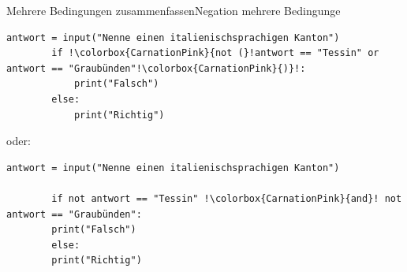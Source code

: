 \begin{frame}[fragile]{Mehrere Bedingungen zusammenfassen}{Negation mehrere Bedingunge}
    \begin{lstlisting}[escapechar=!, basicstyle=\ttfamily\footnotesize]
        antwort = input("Nenne einen italienischsprachigen Kanton")
        if !\colorbox{CarnationPink}{not (}!antwort == "Tessin" or antwort == "Graubünden"!\colorbox{CarnationPink}{)}!:
            print("Falsch")
        else:
            print("Richtig")
    \end{lstlisting}
    
    oder:
    
    \begin{lstlisting}[escapechar=!, basicstyle=\ttfamily\footnotesize]
        antwort = input("Nenne einen italienischsprachigen Kanton")
        
        if not antwort == "Tessin" !\colorbox{CarnationPink}{and}! not antwort == "Graubünden":
        print("Falsch")
        else:
        print("Richtig")
    \end{lstlisting}
\end{frame}
